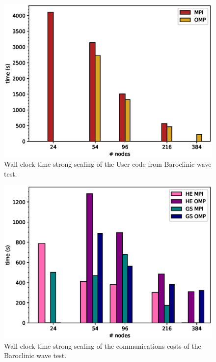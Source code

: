\begin{figure}
\centering\includegraphics[width=1.0\linewidth]{figs/U-scale.eps}
\caption{\label{fig:U_scale}Wall-clock time strong scaling of the 
  User code from Baroclinic wave test.}
\end{figure} 

\begin{figure}
\centering\includegraphics[width=1.0\linewidth]{figs/comms-scale.eps}
\caption{\label{fig:comns_scale}Wall-clock time strong scaling of the 
  communications costs of the Baroclinic wave test.}
\end{figure} 

